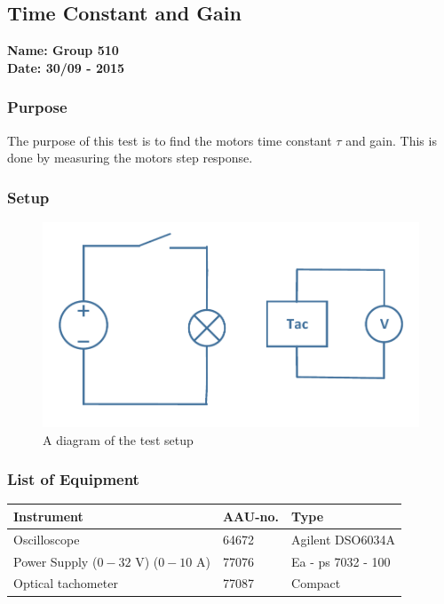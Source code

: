 \pagebreak
\subsection{Time Constant and Gain} %
\textbf{Name: Group 510}\\
\textbf{Date: 30/09 - 2015}

\subsubsection{Purpose}
The purpose of this test is to find the motors time constant $\tau$ and gain. This is done by measuring the motors step response.

\subsubsection{Setup}
\begin{figure}[H]
  \centering
	\includegraphics[scale=0.5]{figures/MotorTest8.pdf}
	\caption{A diagram of the test setup}
\end{figure}

\subsubsection{List of Equipment}

\begin{table}[H]
\begin{tabular}{|l|l|p{4cm}|}
\hline%
  \textbf{Instrument}                        &  \textbf{AAU-no.}  &  \textbf{Type}       \\
\hline%
  Oscilloscope                               &  64672             &  Agilent DSO6034A    \\
\hline%
  Power Supply ($0 - 32$ V) ($0 - 10$ A)     &  77076             &  Ea - ps 7032 - 100  \\
\hline%
  Optical tachometer                         &  77087             &  Compact             \\
\hline%
\end{tabular}
\end{table}

